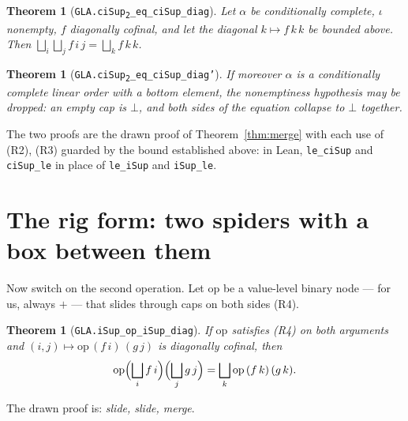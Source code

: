 \documentclass[11pt,a4paper]{article}
\newcommand{\lean}[1]{\texttt{\small #1}}
\theoremstyle{definition}
\theoremstyle{plain}
\newtheorem{theorem}[definition]{Theorem}
\theoremstyle{remark}
\begin{document}
\begin{theorem}[\lean{GLA.ciSup\textsubscript{2}\_eq\_ciSup\_diag}]
Let $\alpha$ be conditionally complete, $\iota$ nonempty, $f$ diagonally
cofinal, and let the diagonal $k\mapsto f\,k\,k$ be bounded above. Then
$\bigsqcup_i\bigsqcup_j f\,i\,j=\bigsqcup_k f\,k\,k$.
\end{theorem}

\begin{theorem}[\lean{GLA.ciSup\textsubscript{2}\_eq\_ciSup\_diag'}]
If moreover $\alpha$ is a conditionally complete linear order with a bottom
element, the nonemptiness hypothesis may be dropped: an empty cap is $\bot$,
and both sides of the equation collapse to $\bot$ together.
\end{theorem}

\noindent
The two proofs are the drawn proof of Theorem~\ref{thm:merge} with each use of
(R2), (R3) guarded by the bound established above: in Lean, \lean{le\_ciSup}
and \lean{ciSup\_le} in place of \lean{le\_iSup} and \lean{iSup\_le}.

\section{The rig form: two spiders with a box between them}

Now switch on the second operation. Let $\mathrm{op}$ be a value-level binary
node --- for us, always $+$ --- that slides through caps on both sides (R4).

\begin{theorem}[\lean{GLA.iSup\_op\_iSup\_diag}]\label{thm:rig}
If $\mathrm{op}$ satisfies (R4) on both arguments and
$(i,j)\mapsto\mathrm{op}\,(f\,i)\,(g\,j)$ is diagonally cofinal, then
\[
\mathrm{op}\Bigl(\bigsqcup_i f\,i\Bigr)\Bigl(\bigsqcup_j g\,j\Bigr)
= \bigsqcup_k \mathrm{op}\,(f\,k)\,(g\,k).
\]
\end{theorem}

\noindent The drawn proof is: \emph{slide, slide, merge}.
\end{document}
